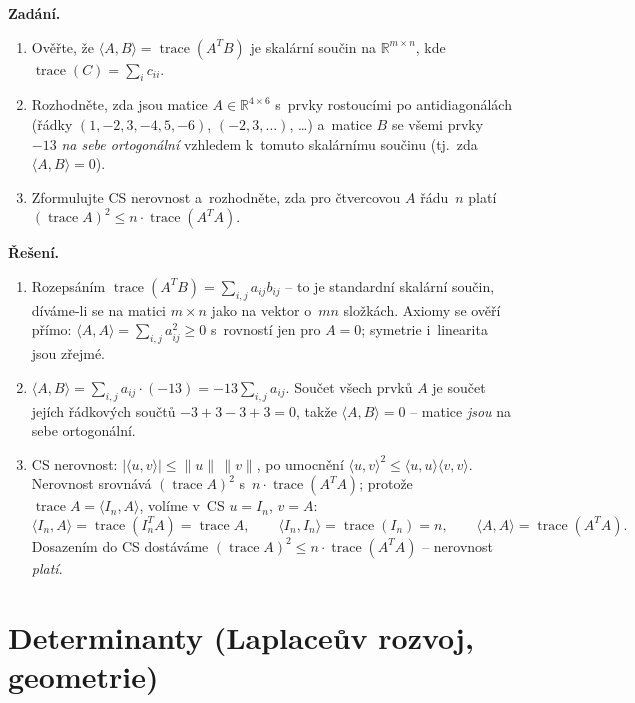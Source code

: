 \documentclass[11pt,a4paper]{article}
\newcommand{\tr}{\operatorname{trace}}
\begin{document}
\begin{priklad} \par
\textbf{Zadání.}
\begin{enumerate}[label=(\arabic*)]
  \item Ověřte, že $\langle A,B\rangle=\tr(A^TB)$ je skalární součin na $\mathbb{R}^{m\times n}$, kde $\tr(C)=\sum_i c_{ii}$.
  \item Rozhodněte, zda jsou matice $A\in\mathbb{R}^{4\times6}$ s~prvky rostoucími po antidiagonálách (řádky $(1,-2,3,-4,5,-6)$, $(-2,3,\dots)$, \dots) a~matice $B$ se všemi prvky $-13$ \emph{na sebe ortogonální} vzhledem k~tomuto skalárnímu součinu (tj.\ zda $\langle A,B\rangle=0$).
  \item Zformulujte CS nerovnost a~rozhodněte, zda pro čtvercovou $A$ řádu~$n$ platí $(\tr A)^2\le n\cdot\tr(A^TA)$.
\end{enumerate}

\textbf{Řešení.}
\begin{enumerate}[label=(\arabic*)]
  \item Rozepsáním $\tr(A^TB)=\sum_{i,j}a_{ij}b_{ij}$ -- to je standardní skalární součin, díváme-li se na matici $m\times n$ jako na vektor o~$mn$ složkách. Axiomy se ověří přímo: $\langle A,A\rangle=\sum_{i,j}a_{ij}^2\ge0$ s~rovností jen pro $A=0$; symetrie i~linearita jsou zřejmé.
  \item $\langle A,B\rangle=\sum_{i,j}a_{ij}\cdot(-13)=-13\sum_{i,j}a_{ij}$. Součet všech prvků $A$ je součet jejích řádkových součtů $-3+3-3+3=0$, takže $\langle A,B\rangle=0$ -- matice \emph{jsou} na sebe ortogonální.
  \item CS nerovnost: $|\langle u,v\rangle|\le\|u\|\,\|v\|$, po umocnění $\langle u,v\rangle^2\le\langle u,u\rangle\langle v,v\rangle$. Nerovnost srovnává $(\tr A)^2$ s~$n\cdot\tr(A^TA)$; protože $\tr A=\langle I_n,A\rangle$, volíme v~CS $u=I_n$, $v=A$:
    \[ \langle I_n,A\rangle=\tr(I_n^TA)=\tr A,\qquad \langle I_n,I_n\rangle=\tr(I_n)=n,\qquad \langle A,A\rangle=\tr(A^TA). \]
    Dosazením do CS dostáváme $(\tr A)^2\le n\cdot\tr(A^TA)$ -- nerovnost \emph{platí}.
\end{enumerate}
\end{priklad}

\section{Determinanty (Laplaceův rozvoj, geometrie)}
\end{document}

